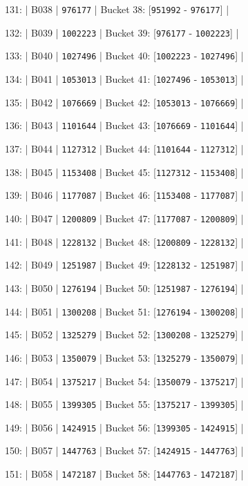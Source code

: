 \documentclass[11pt,a4paper]{article}
\begin{document}
{131: | B038 | \texttt{976177} | Bucket 38: [\texttt{951992} - \texttt{976177}] |

132: | B039 | \texttt{1002223} | Bucket 39: [\texttt{976177} - \texttt{1002223}] |

133: | B040 | \texttt{1027496} | Bucket 40: [\texttt{1002223} - \texttt{1027496}] |

134: | B041 | \texttt{1053013} | Bucket 41: [\texttt{1027496} - \texttt{1053013}] |

135: | B042 | \texttt{1076669} | Bucket 42: [\texttt{1053013} - \texttt{1076669}] |

136: | B043 | \texttt{1101644} | Bucket 43: [\texttt{1076669} - \texttt{1101644}] |

137: | B044 | \texttt{1127312} | Bucket 44: [\texttt{1101644} - \texttt{1127312}] |

138: | B045 | \texttt{1153408} | Bucket 45: [\texttt{1127312} - \texttt{1153408}] |

139: | B046 | \texttt{1177087} | Bucket 46: [\texttt{1153408} - \texttt{1177087}] |

140: | B047 | \texttt{1200809} | Bucket 47: [\texttt{1177087} - \texttt{1200809}] |

141: | B048 | \texttt{1228132} | Bucket 48: [\texttt{1200809} - \texttt{1228132}] |

142: | B049 | \texttt{1251987} | Bucket 49: [\texttt{1228132} - \texttt{1251987}] |

143: | B050 | \texttt{1276194} | Bucket 50: [\texttt{1251987} - \texttt{1276194}] |

144: | B051 | \texttt{1300208} | Bucket 51: [\texttt{1276194} - \texttt{1300208}] |

145: | B052 | \texttt{1325279} | Bucket 52: [\texttt{1300208} - \texttt{1325279}] |

146: | B053 | \texttt{1350079} | Bucket 53: [\texttt{1325279} - \texttt{1350079}] |

147: | B054 | \texttt{1375217} | Bucket 54: [\texttt{1350079} - \texttt{1375217}] |

148: | B055 | \texttt{1399305} | Bucket 55: [\texttt{1375217} - \texttt{1399305}] |

149: | B056 | \texttt{1424915} | Bucket 56: [\texttt{1399305} - \texttt{1424915}] |

150: | B057 | \texttt{1447763} | Bucket 57: [\texttt{1424915} - \texttt{1447763}] |

151: | B058 | \texttt{1472187} | Bucket 58: [\texttt{1447763} - \texttt{1472187}] |

}
\end{document}
